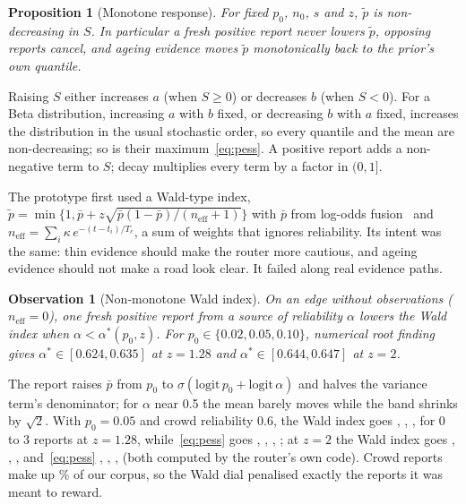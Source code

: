 \documentclass[conference]{IEEEtran}
\newtheorem{proposition}{Proposition}
\newtheorem{observation}{Observation}
\begin{document}
\begin{proposition}[Monotone response]\label{prop:mono}
For fixed $p_0$, $n_0$, $s$ and $z$, $\tilde p$ is non-decreasing in $S$. In particular a fresh positive report never lowers $\tilde p$, opposing reports cancel, and ageing evidence moves $\tilde p$ monotonically back to the prior's own quantile.
\end{proposition}
\begin{IEEEproof}
Raising $S$ either increases $a$ (when $S\ge0$) or decreases $b$ (when $S<0$). For a Beta distribution, increasing $a$ with $b$ fixed, or decreasing $b$ with $a$ fixed, increases the distribution in the usual stochastic order, so every quantile and the mean are non-decreasing; so is their maximum~\eqref{eq:pess}. A positive report adds a non-negative term to $S$; decay multiplies every term by a factor in $(0,1]$.
\end{IEEEproof}

The prototype first used a Wald-type index, $\tilde p=\min\{1,\bar p+z\sqrt{\bar p(1-\bar p)/(n_{\mathrm{eff}}+1)}\}$ with $\bar p$ from log-odds fusion~\cite{elfes1989occupancy} and $n_{\mathrm{eff}}=\sum_i\kappa\,e^{-(t-t_i)/T_c}$, a sum of weights that ignores reliability. Its intent was the same: thin evidence should make the router more cautious, and ageing evidence should not make a road look clear. It failed along real evidence paths.

\begin{observation}[Non-monotone Wald index]\label{obs:dip}
On an edge without observations ($n_{\mathrm{eff}}=0$), one fresh positive report from a source of reliability $\alpha$ lowers the Wald index when $\alpha<\alpha^*(p_0,z)$. For $p_0\in\{0.02,0.05,0.10\}$, numerical root finding gives $\alpha^*\in[0.624,0.635]$ at $z=1.28$ and $\alpha^*\in[0.644,0.647]$ at $z=2$.
\end{observation}
The report raises $\bar p$ from $p_0$ to $\sigma(\mathrm{logit}\,p_0+\mathrm{logit}\,\alpha)$ and halves the variance term's denominator; for $\alpha$ near 0.5 the mean barely moves while the band shrinks by $\sqrt2$. With $p_0=0.05$ and crowd reliability 0.6, the Wald index goes \ExWaldLoA, \ExWaldLoB, \ExWaldLoC, \ExWaldLoD{} for 0 to 3 reports at $z=1.28$, while~\eqref{eq:pess} goes \ExBetaLoA, \ExBetaLoB, \ExBetaLoC, \ExBetaLoD; at $z=2$ the Wald index goes \ExWaldHiA, \ExWaldHiB, \ExWaldHiC, \ExWaldHiD{} and~\eqref{eq:pess} \ExBetaHiA, \ExBetaHiB, \ExBetaHiC, \ExBetaHiD{} (both computed by the router's own code). Crowd reports make up \CrowdShare\% of our corpus, so the Wald dial penalised exactly the reports it was meant to reward.
\end{document}
